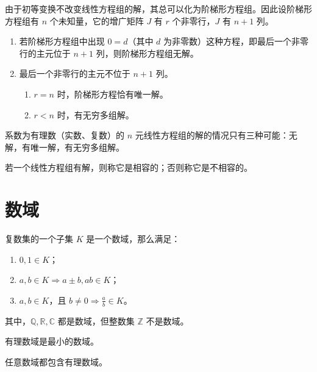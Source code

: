 由于初等变换不改变线性方程组的解，其总可以化为阶梯形方程组。因此设阶梯形方程组有 $n$ 个未知量，它的增广矩阵 $J$ 有 $r$ 个非零行，$J$ 有 $n+1$ 列。

\begin{enumerate}
	\item 若阶梯形方程组中出现 $0=d$（其中 $d$ 为非零数）这种方程，即最后一个非零行的主元位于 $n+1$ 列，则阶梯形方程组无解。
	\item 最后一个非零行的主元不位于 $n+1$ 列。

	      \begin{enumerate}
		      \item $r=n$ 时，阶梯形方程恰有唯一解。
		      \item $r<n$ 时，有无穷多组解。
	      \end{enumerate}
\end{enumerate}

\begin{theorem}
	系数为有理数（实数、复数）的 $n$ 元线性方程组的解的情况只有三种可能：无解，有唯一解，有无穷多组解。
\end{theorem}

若一个线性方程组有解，则称它是相容的；否则称它是不相容的。

\section{数域}

\begin{definition}
	复数集的一个子集 $K$ 是一个数域，那么满足：

	\begin{enumerate}
		\item $0,1 \in K$；
		\item $a,b \in K \Rightarrow a \pm b,ab \in K$；
		\item $a,b \in K$，且 $b \ne 0 \Rightarrow \frac{a}{b} \in K$。
	\end{enumerate}
\end{definition}

其中，$\mathbb{Q},\mathbb{R},\mathbb{C}$ 都是数域，但整数集 $\mathbb{Z}$ 不是数域。

有理数域是最小的数域。

\begin{theorem}
	任意数域都包含有理数域。
\end{theorem}



